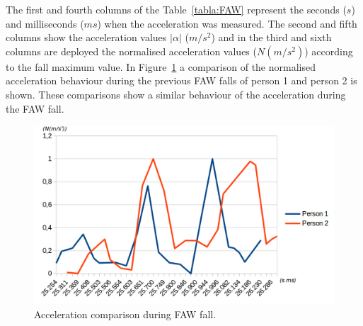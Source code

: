 \documentclass[review]{elsarticle}
\begin{document}
The first and fourth columns of the Table~\ref{tabla:FAW} represent
the seconds ($s$) and milliseconds 
($ms$) when the acceleration was measured. The second and fifth columns show the acceleration 
values $|\alpha|$  ($m/s^2$) and in the third and sixth columns are deployed the normalised acceleration values 
($N(m/s^2)$) according to the fall maximum value. In Figure~\ref{fig:FAWcomparison} a comparison 
of the normalised acceleration behaviour during the previous FAW falls of person 1 and person 2 is 
shown. These comparisons show a similar behaviour of the acceleration during the FAW fall.

\begin{figure}[!ht]
  \centering
  \includegraphics[scale=0.2]{img/TwoFallsComparative.png}
  \caption[Acceleration during FAW fall]{Acceleration comparison during FAW fall.}
  \label{fig:FAWcomparison}
\end{figure}
\end{document}
